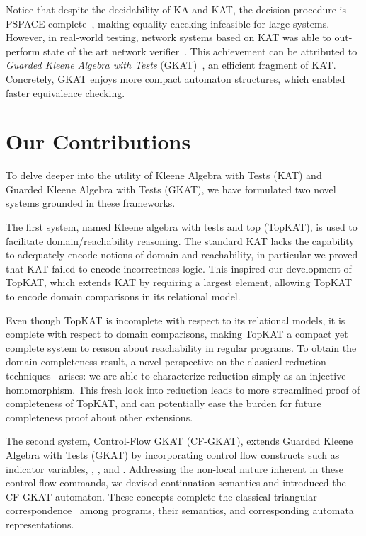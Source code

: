 Notice that despite the decidability of KA and KAT, the decision procedure is PSPACE-complete~\cite{Cohen_Kozen_Smith_1999}, making equality checking infeasible for large systems.
However, in real-world testing, network systems based on KAT was able to out-perform state of the art network verifier~\cite{Smolka_Kumar_Kahn_Foster_Hsu_Kozen_Silva_2019}.
This achievement can be attributed to  \emph{Guarded Kleene Algebra with Tests} (GKAT)~\cite{Smolka_Foster_Hsu_Kappé_Kozen_Silva_2020}, an efficient fragment of KAT. Concretely, GKAT enjoys more compact automaton structures, which enabled faster equivalence checking.

\section{Our Contributions}



To delve deeper into the utility of Kleene Algebra with Tests (KAT) and Guarded Kleene Algebra with Tests (GKAT), we have formulated two novel systems grounded in these frameworks.

The first system, named Kleene algebra with tests and top (TopKAT), is used to facilitate domain/reachability reasoning.  
The standard KAT lacks the capability to adequately encode notions of domain and reachability, in particular we proved that KAT failed to encode incorrectness logic.
This inspired our development of TopKAT, which extends KAT by requiring a largest element, allowing TopKAT to encode domain comparisons in its relational model. 

Even though TopKAT is incomplete with respect to its relational models, it is complete with respect to domain comparisons, making TopKAT a compact yet complete system to reason about reachability in regular programs.
To obtain the domain completeness result, a novel perspective on the classical reduction techniques~\cite{Pous_Rot_Wagemaker_2021,Kozen_Smith_1997} arises: we are able to characterize reduction simply as an injective homomorphism. 
This fresh look into reduction leads to more streamlined proof of completeness of TopKAT, and can potentially ease the burden for future completeness proof about other extensions.

The second system, Control-Flow GKAT (CF-GKAT), extends Guarded Kleene Algebra with Tests (GKAT) by incorporating control flow constructs such as indicator variables, , , and .
Addressing the non-local nature inherent in these control flow commands, we devised continuation semantics and introduced the CF-GKAT automaton.
These concepts complete the classical triangular correspondence~\cite{jacobs_BialgebraicReviewDeterministic_2006,Kozen_2008,Smolka_Foster_Hsu_Kappé_Kozen_Silva_2020} among programs, their semantics, and corresponding automata representations.

